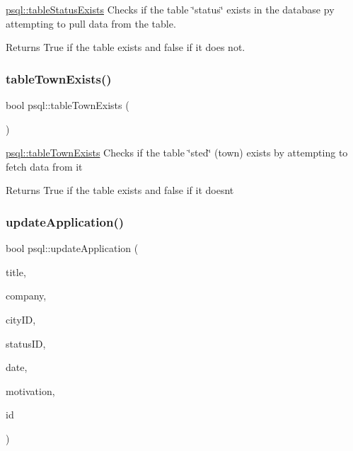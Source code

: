 \mbox{\hyperlink{classpsql_a3f8bac89bd0cee3af77e47e5c555543d}{psql\+::table\+Status\+Exists}} Checks if the table \char`\"{}status\char`\"{} exists in the database py attempting to pull data from the table. 

\begin{DoxyReturn}{Returns}
True if the table exists and false if it does not. 
\end{DoxyReturn}
\mbox{\label{classpsql_a717162b7d7faa0fb41b5a526e42de4ac}} 
\subsubsection{\texorpdfstring{table\+Town\+Exists()}{tableTownExists()}}
{\footnotesize\ttfamily bool psql\+::table\+Town\+Exists (\begin{DoxyParamCaption}{ }\end{DoxyParamCaption})}



\mbox{\hyperlink{classpsql_a717162b7d7faa0fb41b5a526e42de4ac}{psql\+::table\+Town\+Exists}} Checks if the table \char`\"{}sted\char`\"{} (town) exists by attempting to fetch data from it 

\begin{DoxyReturn}{Returns}
True if the table exists and false if it does\textquotesingle{}nt 
\end{DoxyReturn}
\mbox{\label{classpsql_a836eea3c6deb2d6a3a357193a99d6ee7}} 
\subsubsection{\texorpdfstring{update\+Application()}{updateApplication()}}
{\footnotesize\ttfamily bool psql\+::update\+Application (\begin{DoxyParamCaption}\item[{Q\+String}]{title,  }\item[{Q\+String}]{company,  }\item[{int}]{city\+ID,  }\item[{int}]{status\+ID,  }\item[{Q\+String}]{date,  }\item[{Q\+String}]{motivation,  }\item[{int}]{id }\end{DoxyParamCaption})}



